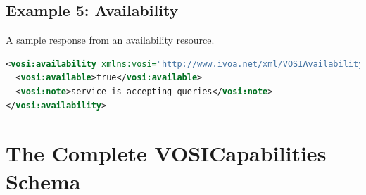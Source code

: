 \documentclass[11pt,letter]{ivoa}
\begin{document}
\subsection{Example 5: Availability}

A sample response from an availability resource.

\begin{lstlisting}[language=XML]
<vosi:availability xmlns:vosi="http://www.ivoa.net/xml/VOSIAvailability/v1.0">
  <vosi:available>true</vosi:available>
  <vosi:note>service is accepting queries</vosi:note>
</vosi:availability>
\end{lstlisting}

\appendix

\section{The Complete VOSICapabilities Schema}
\label{appendix:capabilities}
\end{document}
